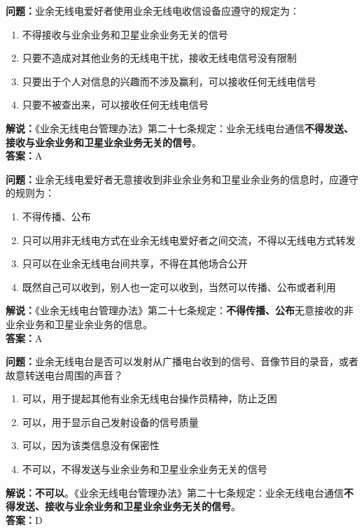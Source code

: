 \noindent\textbf{问题：}业余无线电爱好者使用业余无线电收信设备应遵守的规定为：
\begin{enumerate}[label=\Alph*), leftmargin=3em]
	\item 不得接收与业余业务和卫星业余业务无关的信号
	\item 只要不造成对其他业务的无线电干扰，接收无线电信号没有限制
	\item 只要出于个人对信息的兴趣而不涉及赢利，可以接收任何无线电信号
	\item 只要不被查出来，可以接收任何无线电信号
\end{enumerate}
\noindent\textbf{解说：}《业余无线电台管理办法》第二十七条规定：业余无线电台通信\textbf{不得发送、接收与业余业务和卫星业余业务无关的信号}。\\\noindent\textbf{答案：}A



\bigskip


\noindent\textbf{问题：}业余无线电爱好者无意接收到非业余业务和卫星业余业务的信息时，应遵守的规则为：
\begin{enumerate}[label=\Alph*), leftmargin=3em]
	\item 不得传播、公布
	\item 只可以用非无线电方式在业余无线电爱好者之间交流，不得以无线电方式转发
	\item 只可以在业余无线电台间共享，不得在其他场合公开
	\item 既然自己可以收到，别人也一定可以收到，当然可以传播、公布或者利用
\end{enumerate}
\noindent\textbf{解说：}《业余无线电台管理办法》第二十七条规定：\textbf{不得传播、公布}无意接收的非业余业务和卫星业余业务的信息。\\\noindent\textbf{答案：}A


\bigskip


\noindent\textbf{问题：}业余无线电台是否可以发射从广播电台收到的信号、音像节目的录音，或者故意转送电台周围的声音？
\begin{enumerate}[label=\Alph*), leftmargin=3em]
	\item 可以，用于提起其他有业余无线电台操作员精神，防止乏困
	\item 可以，用于显示自己发射设备的信号质量
	\item 可以，因为该类信息没有保密性
	\item 不可以，不得发送与业余业务和卫星业余业务无关的信号
\end{enumerate}
\textbf{解说：不可以}。《业余无线电台管理办法》第二十七条规定：业余无线电台通信\textbf{不得发送、接收与业余业务和卫星业余业务无关的信号}。\\\noindent\textbf{答案：}D



